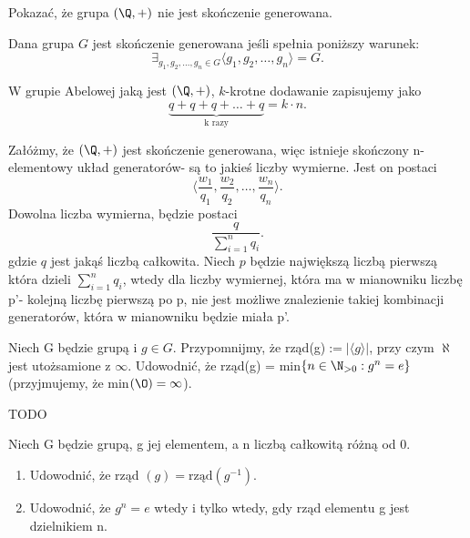 \begin{problem}[6]
	
	Pokazać, że grupa $\left( \Q, + \right)$ nie jest skończenie generowana.
\end{problem}
\begin{solution}

	Dana grupa $G$ jest skończenie generowana jeśli spełnia poniższy warunek:
	\[
		\exists_{g_1,g_2,\ldots,g_{n} \in G} \langle g_1,g_2,\ldots,g_{n} \rangle = G   
	.\] 

	\begin{remark}
	
		W grupie Abelowej jaką jest $\left( \Q, + \right) $, $k$-krotne dodawanie zapisujemy jako
		 \[
			 \underbrace{q + q + q + \ldots + q}_{\text{k razy}} = k \cdot n
		.\] 
	\end{remark}	

	Załóżmy, że $\left( \Q, + \right) $ jest skończenie generowana, więc istnieje skończony n-elementowy układ generatorów- są to jakieś liczby wymierne. Jest on postaci \[
	\langle \frac{w_1}{q_1}, \frac{w_2}{q_2},\ldots, \frac{w_{n}}{q_{n}} \rangle 
	.\] 
	Dowolna liczba wymierna, będzie postaci \[
	\frac{q}{\sum_{i=1}^{n} q_{i}}
	.\] 
	gdzie $q$ jest jakąś liczbą całkowita. Niech $p$ będzie największą liczbą pierwszą która dzieli  $\sum_{i=1}^{n} q_i$, wtedy dla liczby wymiernej, która ma w mianowniku liczbę p'- kolejną liczbę pierwszą po p, nie jest możliwe znalezienie takiej kombinacji generatorów, która w mianowniku będzie miała p'.
\end{solution}
\begin{problem}[7]

	Niech G będzie grupą i $g\in G$. Przypomnijmy, że rząd(g)$ := |\langle g \rangle| $, przy czym $\aleph$ jest utożsamione z  $\infty$. Udowodnić, że rząd(g) = min$\{n \in \N_{>0} : g^{n} = e\}$ (przyjmujemy, że min$\left( \O \right) = \infty$). 
\end{problem}
\begin{solution}

	TODO		
\end{solution}
\begin{problem}[8]	

	Niech G będzie grupą, g jej elementem, a n liczbą całkowitą różną od 0.
	\begin{enumerate}[label=\alph*)]
		\item Udowodnić, że rząd $\left( g \right) = \text{rząd}\left( g^{-1} \right)$.
		\item Udowodnić, że $g^{n} = e$ wtedy i tylko wtedy, gdy rząd elementu g jest dzielnikiem n.
	\end{enumerate}
\end{problem}
